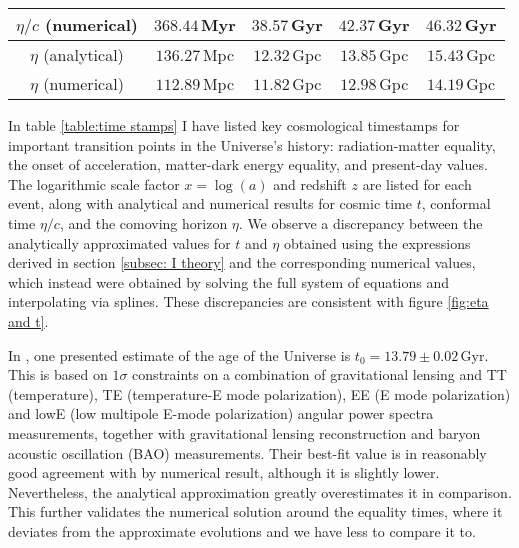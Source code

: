 \documentclass{aa}
\numberwithin{equation}{section}
\numberwithin{table}{section}
\numberwithin{figure}{section}
\begin{document}
\begin{table*}
\begin{tabular}{| c || c | c | c | c |}
     $\eta/c$ (numerical) & \hspace{25pt}$368.44\,$Myr & \hspace{20.5pt}$38.57\,$Gyr & \hspace{19pt}$42.37\,$Gyr & \hspace{25pt}$46.32\,$Gyr \\ 
     \hline 
     \hspace{5.5pt}$\eta$ \hspace{3.5pt}(analytical) & \hspace{25pt}$136.27\,$Mpc & \hspace{20.5pt}$12.32\,$Gpc & \hspace{19pt}$13.85\,$Gpc & \hspace{25pt}$15.43\,$Gpc \\ 
     \hspace{5.5pt}$\eta$ \hspace{3.5pt}(numerical) & \hspace{25pt}$112.89\,$Mpc & \hspace{20.5pt}$11.82\,$Gpc & \hspace{19pt}$12.98\,$Gpc & \hspace{25pt}$14.19\,$Gpc \\ 
  \hline                                   %
  \end{tabular}
  \end{table*}

In table \ref{table:time stamps} I have listed key cosmological timestamps for important transition points in the Universe's history: radiation-matter equality, the onset of acceleration, matter-dark energy equality, and present-day values. The logarithmic scale factor $x = \log (a)$ and redshift $z$ are listed for each event, along with analytical and numerical results for cosmic time $t$, conformal time $\eta/c$, and the comoving horizon $\eta$. We observe a discrepancy between the analytically approximated values for $t$ and $\eta$ obtained using the expressions derived in section \ref{subsec: I theory} and the corresponding numerical values, which instead were obtained by solving the full system of equations and interpolating via splines. These discrepancies are consistent with figure \ref{fig:eta and t}. 

In \citet{Planck}, one presented estimate of the age of the Universe is $t_0=13.79\pm0.02\,\text{Gyr}$. This is based on $1\sigma$ constraints on a combination of gravitational lensing and TT (temperature), TE (temperature-E mode polarization), EE (E mode polarization) and lowE (low multipole E-mode polarization) angular power spectra measurements, together with gravitational lensing reconstruction and baryon acoustic oscillation (BAO) measurements. Their best-fit value is in reasonably good agreement with by numerical result, although it is slightly lower. Nevertheless, the analytical approximation greatly overestimates it in comparison. This further validates the numerical solution around the equality times, where it deviates from the approximate evolutions and we have less to compare it to.
\end{document}
